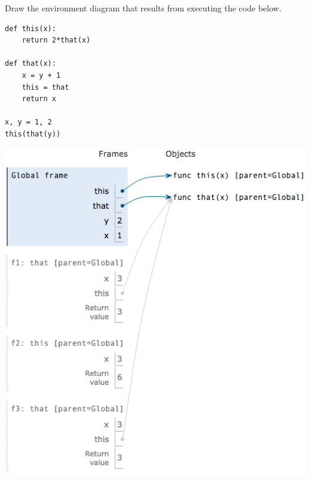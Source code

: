 \question
Draw the environment diagram that results from executing the code below.

\begin{minipage}{\textwidth}
\begin{lstlisting}
def this(x):
    return 2*that(x)

def that(x):
    x = y + 1
    this = that
    return x

x, y = 1, 2
this(that(y))
\end{lstlisting}
\end{minipage}

\begin{solution}[1in]
\begin{center}
\includegraphics[scale=.5]{this-that.png}
\end{center}
\end{solution}
